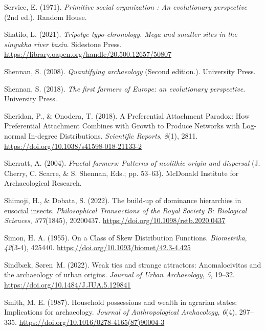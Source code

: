 \documentclass[
  12pt,
]{book}
\newlength{\cslhangindent}
\newlength{\cslentryspacingunit} %
\newenvironment{CSLReferences}[2] %
 {%
  \setlength{\parindent}{0pt}
  \ifodd #1
  \let\oldpar\par
  \def\par{\hangindent=\cslhangindent\oldpar}
  \fi
  \setlength{\parskip}{#2\cslentryspacingunit}
 }%
 {}
\begin{document}
\begin{CSLReferences}{1}{0}
\leavevmode{}%
Service, E. (1971). \emph{Primitive social organization : An evolutionary perspective} (2nd ed.). Random House.

\leavevmode{}%
Shatilo, L. (2021). \emph{Tripolye typo-chronology. Mega and smaller sites in the sinyukha river basin}. Sidestone Press. \url{https://library.oapen.org/handle/20.500.12657/50807}

\leavevmode{}%
Shennan, S. (2008). \emph{Quantifying archaeology} (Second edition.). University Press.

\leavevmode{}%
Shennan, S. (2018). \emph{The first farmers of Europe: an evolutionary perspective}. University Press.

\leavevmode{}%
Sheridan, P., \& Onodera, T. (2018). A Preferential Attachment Paradox: How Preferential Attachment Combines with Growth to Produce Networks with Log-normal In-degree Distributions. \emph{Scientific Reports}, \emph{8}(1), 2811. \url{https://doi.org/10.1038/s41598-018-21133-2}

\leavevmode{}%
Sherratt, A. (2004). \emph{Fractal farmers: Patterns of neolithic origin and dispersal} (J. Cherry, C. Scarre, \& S. Shennan, Eds.; pp. 53--63). McDonald Institute for Archaeological Research.

\leavevmode{}%
Shimoji, H., \& Dobata, S. (2022). The build-up of dominance hierarchies in eusocial insects. \emph{Philosophical Transactions of the Royal Society B: Biological Sciences}, \emph{377}(1845), 20200437. \url{https://doi.org/10.1098/rstb.2020.0437}

\leavevmode{}%
Simon, H. A. (1955). On a Class of Skew Distribution Functions. \emph{Biometrika}, \emph{42}(3-4), 425440. \url{https://doi.org/10.1093/biomet/42.3-4.425}

\leavevmode{}%
Sindbæk, Søren~M. (2022). Weak ties and strange attractors: Anomalocivitas and the archaeology of urban origins. \emph{Journal of Urban Archaeology}, \emph{5}, 19--32. \url{https://doi.org/10.1484/J.JUA.5.129841}

\leavevmode{}%
Smith, M. E. (1987). Household possessions and wealth in agrarian states: Implications for archaeology. \emph{Journal of Anthropological Archaeology}, \emph{6}(4), 297--335. \url{https://doi.org/10.1016/0278-4165(87)90004-3}


\end{CSLReferences}
\end{document}
